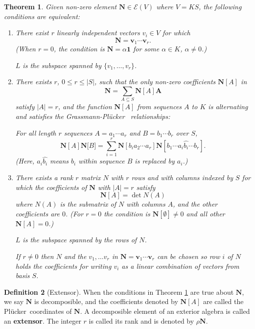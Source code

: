 \documentclass[12pt]{article}
\newtheorem{theorem}{Theorem}[section]
\theoremstyle{definition}
\newtheorem{definition}[theorem]{Definition}
\newcommand{\FieldK}{\ensuremath{K}}
\newcommand{\Card}[1]{\ensuremath{{\left|#1\right|}}}
\newcommand{\ext}[1]{\ensuremath{\mathbf{#1}}}
\newcommand{\Plucker}{Pl\"{u}cker\ }
\begin{document}
\begin{theorem}
\label{ExtTheory}
Given non-zero element $\ext{N}\in\mathcal{E}(V)$ where 
$V=\FieldK S$, the following conditions are equivalent:
\begin{enumerate}
\item
There exist $r$ linearly independent vectors $v_i\in V$ for which
\[
   \ext{N}=\ext{v}_1\cdots \ext{v}_r.
\]
(When $r=0$, the condition is $\ext{N}=\alpha\ext{1}$ for some
$\alpha\in\FieldK$, $\alpha\neq 0$.)

$L$ is the subspace spanned by $\{v_1,\ldots,v_r\}$.

\item
There exists $r$, $0\leq r \leq \Card{S}$, such that the only 
non-zero coefficients $\ext{N}[A]$ in
\[
\ext{N}=\sum_{A\subseteq S}\ext{N}[A]\ext{A}
\]
satisfy $\Card{A}=r$, and the function
$\ext{N}[A]$ from sequences $A$ to $\FieldK$ is alternating and
satisfies the \emph{Grassmann-\Plucker} relationships:

For all length $r$ sequences $A=a_1\cdots a_r$ and $B=b_1\cdots b_r$  over $S$,
\[
\ext{N}[A]\ext{N}\ext[B] = \sum_{i=1}^r 
\ext{N}[b_ia_2\cdots a_r] \ext{N}[b_1\cdots a_i\hat{b_i}\cdots b_r].
\]
(Here, $a_i\hat{b_i}$ means $b_i$ within sequence $B$ is replaced by $a_i$.)

\item There exists a rank $r$ matrix $N$ with $r$ rows and
with columns indexed by
$S$ for which the coefficients of $\ext{N}$ with 
$\Card{A}=r$ satisfy
\[
   \ext{N}[A] = \det N(A)
\]
where $N(A)$ is the submatrix of $N$ with columns $A$, and the other
coefficients are $0$.  (For $r=0$ the condition
is $\ext{N}[\emptyset]\neq 0$ and all other $\ext{N}[A]=0$.)

$L$ is the subspace spanned by the rows of $N$.

If $r\neq 0$ then $N$ and the $v_1,\ldots v_r$ in 
$\ext{N}=\ext{v}_1\cdots\ext{v}_r$
can be chosen so row $i$ of $N$ holds the coefficients for 
writing $v_i$ as a linear combination of vectors from basis $S$.  

\end{enumerate}
\end{theorem}

\begin{definition}[Extensor]
\label{ExtensorDef}
When the conditions in Theorem \ref{ExtTheory} are true about $\ext{N}$, we 
say $\ext{N}$ is decomposible, and the coefficients denoted by
$\ext{N}[A]$ are called the \Plucker coordinates of $\ext{N}$.
A decomposible element of an exterior algebra is called an 
\textbf{extensor}.
The integer $r$ is called its rank and is denoted by $\rho\ext{N}$. 
\end{definition}
\end{document}
